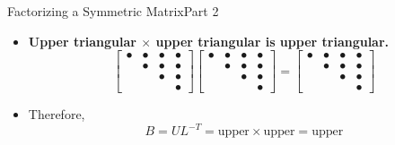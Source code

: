 \documentclass[10pt]{beamer}
\begin{document}
\begin{frame}{Factorizing a Symmetric Matrix}{Part 2}
\begin{itemize}
    \item \textbf{Upper triangular $\times$ upper triangular
    is upper triangular.}
    \[
    \begin{bmatrix}
    \bullet & \bullet & \bullet & \bullet\\
    \phantom{\bullet} & \bullet & \bullet & \bullet\\
    \phantom{\bullet} & \phantom{\bullet} & \bullet & \bullet\\
    \phantom{\bullet} & \phantom{\bullet} & \phantom{\bullet} & \bullet
    \end{bmatrix}
    \begin{bmatrix}
    \bullet & \bullet & \bullet & \bullet\\
    \phantom{\bullet} & \bullet & \bullet & \bullet\\
    \phantom{\bullet} & \phantom{\bullet} & \bullet & \bullet\\
    \phantom{\bullet} & \phantom{\bullet} & \phantom{\bullet} & \bullet
    \end{bmatrix}
    =
    \begin{bmatrix}
    \bullet & \bullet & \bullet & \bullet\\
    \phantom{\bullet} & \bullet & \bullet & \bullet\\
    \phantom{\bullet} & \phantom{\bullet} & \bullet & \bullet\\
    \phantom{\bullet} & \phantom{\bullet} & \phantom{\bullet} & \bullet
    \end{bmatrix}
    \]
    \item Therefore, 
        $$B=UL^{-T}=\text{upper}\times\text{upper}=\text{upper}$$

\end{itemize}


\end{frame}

\end{document}

